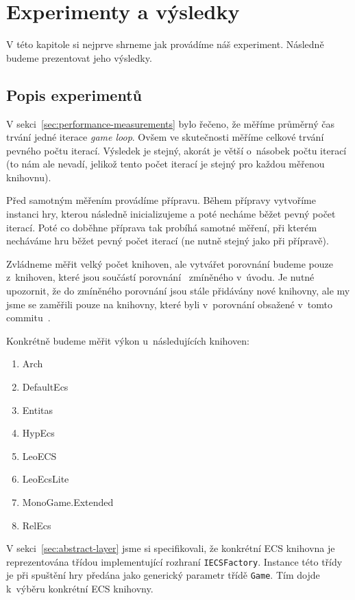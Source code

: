 \chapter{Experimenty a výsledky}
V této kapitole si nejprve shrneme jak provádíme náš experiment. Následně budeme prezentovat jeho výsledky.

\section{Popis experimentů}
V sekci~\ref{sec:performance-measurements} bylo řečeno, že měříme průměrný čas trvání jedné iterace \textit{game loop}. Ovšem ve skutečnosti měříme celkové trvání pevného počtu iterací. Výsledek je stejný, akorát je větší o~násobek počtu iterací (to nám ale nevadí, jelikož tento počet iterací je stejný pro každou měřenou knihovnu).

Před samotným měřením provádíme přípravu. Během přípravy vytvoříme instanci hry, kterou následně inicializujeme a poté necháme běžet pevný počet iterací. Poté co doběhne příprava tak probíhá samotné měření, při kterém  necháváme hru běžet pevný počet iterací (ne nutně stejný jako při přípravě).

Zvládneme měřit velký počet knihoven, ale vytvářet porovnání budeme pouze z~knihoven, které jsou součástí porovnání~\cite{EcsCsharpBenchmark} zmíněného v~úvodu. Je nutné upozornit, že do zmíněného porovnání jsou stále přidávány nové knihovny, ale my jsme se zaměřili pouze na knihovny, které byli v~porovnání obsažené v~tomto commitu~\cite{EcsCsharpBenchmarkCommit}.


Konkrétně budeme měřit výkon u~následujících knihoven:

\begin{enumerate}
    \item Arch~\cite{Arch}
    \item DefaultEcs~\cite{DefaultEcs}
    \item Entitas~\cite{Entitas}
    \item HypEcs~\cite{HypEcs}
    \item LeoECS~\cite{LeoECS}
    \item LeoEcsLite~\cite{LeoEcsLite}
    \item MonoGame.Extended~\cite{MonoGameExtended}
    \item RelEcs~\cite{RelEcs}
\end{enumerate}

V sekci~\ref{sec:abstract-layer} jsme si specifikovali, že konkrétní ECS knihovna je reprezentována třídou implementující rozhraní \texttt{IECSFactory}. Instance této třídy je při spuštění hry předána jako generický parametr třídě \texttt{Game}. Tím dojde k~výběru konkrétní ECS knihovny.

